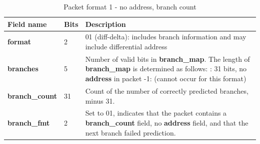 \begin{table}[htp]
  \centering
  \caption{Packet format 1 - no address, branch count}
  \label{tab:te_inst1-noaddr-count}
  \begin{tabulary}{\textwidth}{|l|p{35mm}|p{90mm}|}
    \hline
    {\bf Field name} & {\bf Bits} & {\bf Description} \\
    \hline
    \textbf{format}	& 2	& 01 (diff-delta): includes branch information and may include differential address\\
    \hline
    \textbf{branches} & 5 & Number of valid bits in \textbf{branch\_map}. The length of \textbf{branch\_map} is determined as follows: :    31 bits, no \textbf{address} in packet -1: (cannot occur for this format) \\
    \hline
    \textbf{branch\_count} & 31 & Count of the number of correctly predicted branches, minus 31. \\
    \hline
    \textbf{branch\_fmt} & 2 & Set to 01, indicates that the packet contains a \textbf{branch\_count} field, no
    \textbf{address} field, and that the next branch failed prediction. \\
    \hline
  \end{tabulary}
\end{table}

